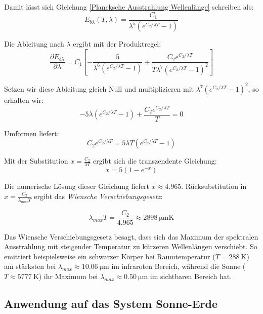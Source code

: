 \documentclass[12pt,a4paper]{article}
\begin{document}
Damit lässt sich Gleichung \eqref{Plancksche Ausstrahlung Wellenlänge} schreiben als:
\begin{equation*}
  E_{b\lambda}(T, \lambda) = \frac{C_1}{\lambda^5(e^{C_2/\lambda T}-1)}
\end{equation*}

Die Ableitung nach $\lambda$ ergibt mit der Produktregel:
\begin{equation*}
  \frac{\partial E_{b\lambda}}{\partial \lambda} = C_1 \left[ -\frac{5}{\lambda^6(e^{C_2/\lambda T}-1)} + \frac{C_2 e^{C_2/\lambda T}}{T\lambda^7(e^{C_2/\lambda T}-1)^2} \right]
\end{equation*}

Setzen wir diese Ableitung gleich Null und multiplizieren mit $\lambda^7(e^{C_2/\lambda T}-1)^2$, so erhalten wir:
\begin{equation*}
  -5\lambda(e^{C_2/\lambda T}-1) + \frac{C_2 e^{C_2/\lambda T}}{T} = 0
\end{equation*}

Umformen liefert:
\begin{equation*}
  C_2 e^{C_2/\lambda T} = 5\lambda T(e^{C_2/\lambda T}-1)
\end{equation*}

Mit der Substitution $x = \frac{C_2}{\lambda T}$ ergibt sich die transzendente Gleichung:
\begin{equation*}
  x = 5(1 - e^{-x})
\end{equation*}

Die numerische Lösung dieser Gleichung liefert $x \approx 4.965$. 
Rücksubstitution in $x = \frac{C_2}{\lambda_{max} T}$ ergibt das \textit{Wiensche Verschiebungsgesetz}:

\begin{equation}
  \label{Wiensches Verschiebungsgesetz}
  \lambda_{max} T = \frac{C_2}{4.965} \approx \SI{2898}{\micro\meter\kelvin}
\end{equation}

Das Wiensche Verschiebungsgesetz besagt, dass sich das Maximum der spektralen Ausstrahlung mit steigender Temperatur zu kürzeren Wellenlängen verschiebt. 
So emittiert beispielsweise ein schwarzer Körper bei Raumtemperatur ($T = \SI{288}{\kelvin}$) am stärksten bei $\lambda_{max} \approx \SI{10.06}{\micro\meter}$ im infraroten Bereich, 
während die Sonne ($T \approx \SI{5777}{\kelvin}$) ihr Maximum bei $\lambda_{max} \approx \SI{0.50}{\micro\meter}$ im sichtbaren Bereich hat.


\subsection{Anwendung auf das System Sonne-Erde}
\end{document}
